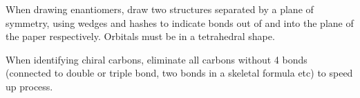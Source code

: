 \documentclass[../main]{subfiles}
\begin{document}
	When drawing enantiomers, draw two structures separated by a plane of symmetry, using wedges and hashes to indicate bonds out of and into the plane of the paper respectively. Orbitals must be in a tetrahedral shape. \\


	When identifying chiral carbons, eliminate all carbons without 4 bonds (connected to double or triple bond, two bonds in a skeletal formula etc) to speed up process.

\end{document}
